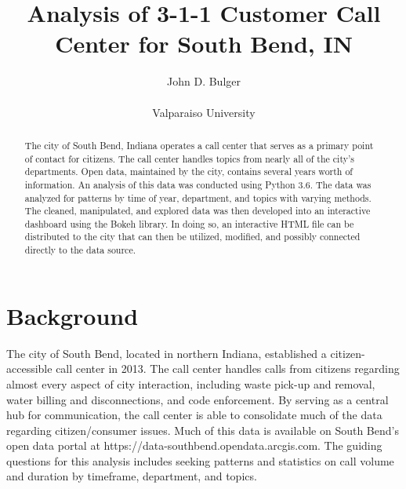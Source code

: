 \documentclass[11pt,twocolumn]{article}
\title{Analysis of 3-1-1 Customer Call Center for South Bend, IN}
\author{John D. Bulger\\
\\
Valparaiso University\\
}
\begin{document}
\maketitle

\begin{abstract}
The city of South Bend, Indiana operates a call center that serves as a primary point of contact for citizens.  The call center handles topics from nearly all of the city's departments.  Open data, maintained by the city, contains several years worth of information.  An analysis of this data was conducted using Python 3.6.  The data was 
analyzed for patterns by time of year, department, and topics with varying methods.  The cleaned, manipulated, and explored data was then developed into an 
interactive dashboard using the Bokeh library.  In doing so, an interactive HTML file can be distributed to the city that can then be utilized, modified, and possibly connected 
directly to the data source.
\end{abstract}

\section{Background}
The city of South Bend, located in northern Indiana, established a citizen-accessible call center in 2013.  %
The call center handles calls from citizens regarding almost every aspect of city interaction, including waste pick-up and removal, water billing and disconnections, 
and code enforcement.  By serving as a central hub for communication, the call center is able to consolidate much of the data regarding citizen/consumer issues.  
Much of this data is available on South Bend's open data portal at https://data-southbend.opendata.arcgis.com.  The guiding questions for this analysis includes seeking patterns and statistics on call volume and duration by timeframe, department, and topics.
\end{document}
